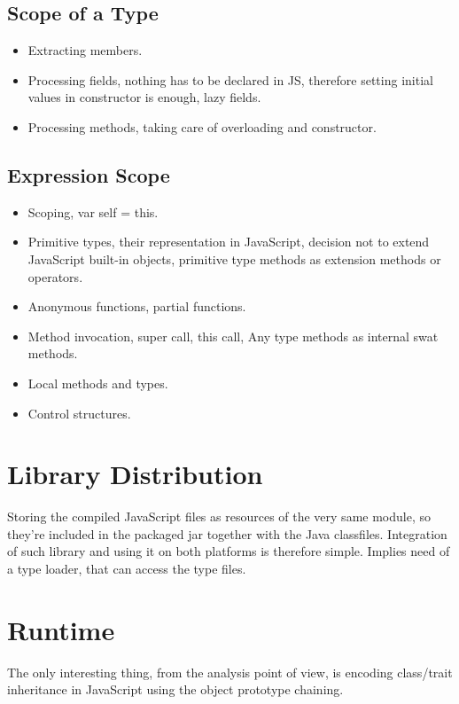\documentclass[12pt,a4paper]{report}
\begin{document}
\subsection{Scope of a Type}

\begin{itemize}
\item Extracting members.
\item Processing fields, nothing has to be declared in JS, therefore setting initial values in constructor is enough, lazy fields.
\item Processing methods, taking care of overloading and constructor.
\end{itemize}

\subsection{Expression Scope}

\begin{itemize}
\item Scoping, var self = this.
\item Primitive types, their representation in JavaScript, decision not to extend JavaScript built-in objects, primitive type methods as extension methods or operators.
\item Anonymous functions, partial functions.
\item Method invocation, super call, this call, Any type methods as internal swat methods.
\item Local methods and types.
\item Control structures.
\end{itemize}

\section{Library Distribution}

Storing the compiled JavaScript files as resources of the very same module, so they're included in the packaged jar together with the Java classfiles. Integration of such library and using it on both platforms is therefore simple. Implies need of a type loader, that can access the type files.

\section{Runtime}

The only interesting thing, from the analysis point of view, is encoding class/trait inheritance in JavaScript using the object prototype chaining.
\end{document}
